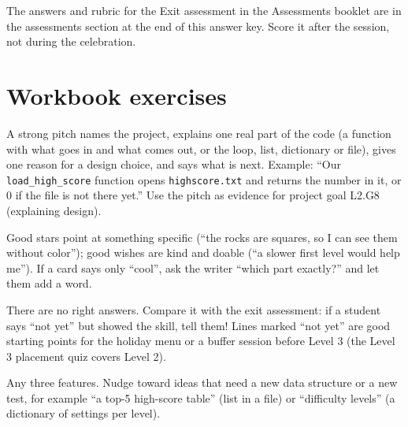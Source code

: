 
\begin{teachernote}
The answers and rubric for the Exit assessment in the Assessments booklet are in the assessments
section at the end of this answer key. Score it after the session, not during the celebration.
\end{teachernote}

\section{Workbook exercises}
\begin{answer}
A strong pitch names the project, explains one real part of the code (a function with what goes in
and what comes out, or the loop, list, dictionary or file), gives one reason for a design choice,
and says what is next. Example: \enquote{Our \texttt{load\_high\_score} function opens
\texttt{highscore.txt} and returns the number in it, or 0 if the file is not there yet.} Use the pitch
as evidence for project goal L2.G8 (explaining design).
\end{answer}

\begin{answer}
Good stars point at something specific (\enquote{the rocks are squares, so I can see them without
color}); good wishes are kind and doable (\enquote{a slower first level would help me}). If a card
says only \enquote{cool}, ask the writer \enquote{which part exactly?} and let them add a word.
\end{answer}

\begin{answer}
There are no right answers. Compare it with the exit assessment: if a student says \enquote{not yet}
but showed the skill, tell them! Lines marked \enquote{not yet} are good starting points for the
holiday menu or a buffer session before Level 3 (the Level 3 placement quiz covers Level 2).
\end{answer}

\begin{answer}
Any three features. Nudge toward ideas that need a new data structure or a new test, for example
\enquote{a top-5 high-score table} (list in a file) or \enquote{difficulty levels} (a dictionary of
settings per level).
\end{answer}

